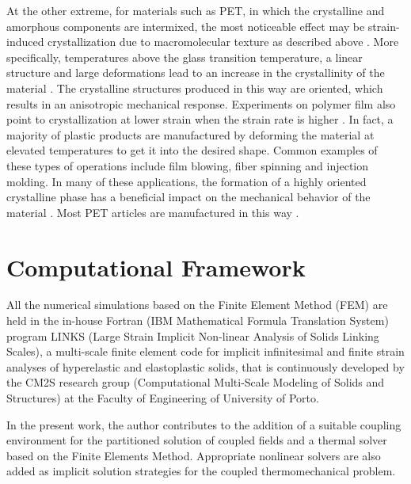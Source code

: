 At the other extreme, for materials such as PET, in which the crystalline and amorphous components are intermixed, the most noticeable effect may be strain-induced crystallization due to macromolecular texture as described above \citep{wardIntroductionMechanicalProperties2004}.
More specifically, temperatures above the glass transition temperature, a linear structure and large deformations lead to an increase in the crystallinity of the material \citep{ahziModelingDeformationBehavior2003}.
The crystalline structures produced in this way are oriented, which results in an anisotropic mechanical response.
Experiments on polymer film also point to crystallization at lower strain when the strain rate is higher \citep{raoStudyStraininducedCrystallization2001}.
In fact,  a majority of plastic products are manufactured by deforming the material at elevated temperatures to get it into the desired shape.
Common examples of these types of operations include film blowing, fiber spinning and injection molding.
In many of these applications, the formation of a highly oriented crystalline phase has a beneficial impact on the mechanical behavior of the material \citep{dairaniehPhenomenologicalModelFlowInduced1999, raoStudyStraininducedCrystallization2001}.
Most PET articles are manufactured in this way \citep{boyceConstitutiveModelFinite2000, raoStudyStraininducedCrystallization2001, makradiTwophaseSelfconsistentModel2005}.


\section{Computational Framework}

All the numerical simulations based on the Finite Element Method (FEM) are held in the in-house Fortran (IBM Mathematical Formula Translation System) program LINKS (Large Strain Implicit Non-linear Analysis of Solids Linking Scales), a multi-scale finite element code for implicit infinitesimal and finite strain analyses of hyperelastic and elastoplastic solids, that is continuously developed by the CM2S research group (Computational Multi-Scale Modeling of Solids and Structures) at the Faculty of Engineering of University of Porto.

In the present work, the author contributes to the addition of a suitable coupling environment for the partitioned solution of coupled fields and a thermal solver based on the Finite Elements Method.
Appropriate nonlinear solvers are also added as implicit solution strategies for the coupled thermomechanical problem.

